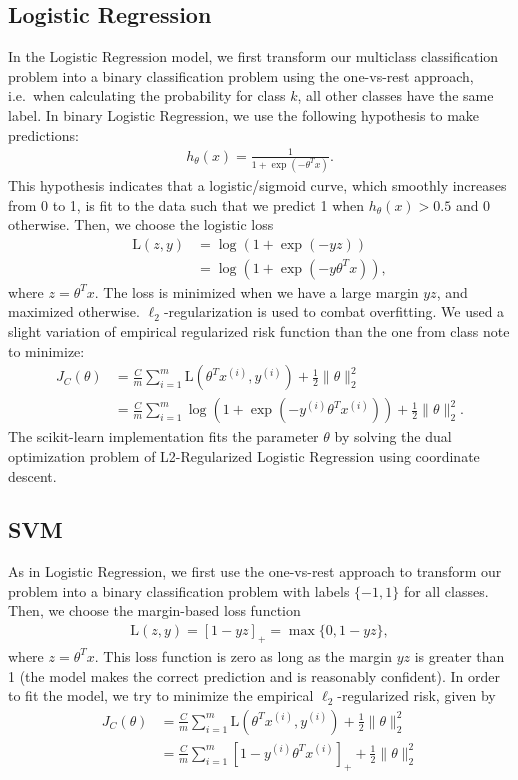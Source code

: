 \subsection{Logistic Regression}
In the Logistic Regression model, we first transform our multiclass classification problem into a binary classification problem using the one-vs-rest approach, i.e.\ when calculating the probability for class $k$, all other classes have the same label. In binary Logistic Regression, we use the following hypothesis to make predictions:
\begin{align*}
h_{\theta}(x) = \frac{1}{1+\exp(-\theta^Tx)}.
\end{align*}
This hypothesis indicates that a logistic/sigmoid curve, which smoothly increases from 0 to 1, is fit to the data such that we predict 1 when $h_\theta(x) > 0.5$ and 0 otherwise. Then, we choose the logistic loss
\begin{align*}
\mathrm{L}(z, y) &= \log(1+\exp(-yz))\\
&= \log(1+\exp(-y\theta^Tx)),
\end{align*}
where $z=\theta^Tx$. The loss is minimized when we have a large margin $yz$, and maximized otherwise. $\ell_2$-regularization is used to combat overfitting. We used a slight variation of empirical regularized risk function than the one from class note to minimize:
\begin{align}\label{eq:logreg}
J_C(\theta) &= \frac{C}{m}\sum_{i=1}^m\mathrm{L}(\theta^Tx^{(i)}, y^{(i)}) + \frac{1}{2}\lVert\theta\rVert_2^2\\
&= \frac{C}{m}\sum_{i=1}^m\log(1+\exp(-y^{(i)}\theta^Tx^{(i)})) + \frac{1}{2}\lVert\theta\rVert_2^2.
\end{align}
The scikit-learn implementation fits the parameter $\theta$ by solving the dual optimization problem of L2-Regularized Logistic Regression using coordinate descent\cite{fan2008liblinear}.

\subsection{SVM}
As in Logistic Regression, we first use the one-vs-rest approach to transform our problem into a binary classification problem with labels $\{-1, 1\}$ for all classes. Then, we choose the margin-based loss function
\begin{align*}
\mathrm{L}(z,y) = [1-yz]_+ = \max\{0, 1-yz\},
\end{align*}
where $z=\theta^Tx$. This loss function is zero as long as the margin $yz$ is greater than 1 (the model makes the correct prediction and is reasonably confident). In order to fit the model, we try to minimize the empirical $\ell_2$-regularized risk, given by
\begin{align}
J_C(\theta) &= \frac{C}{m}\sum_{i=1}^m\mathrm{L}(\theta^Tx^{(i)},y^{(i)}) + \frac{1}{2}\lVert\theta\rVert_2^2\\
&= \frac{C}{m}\sum_{i=1}^m[1-y^{(i)}\theta^Tx^{(i)}]_+ + \frac{1}{2}\lVert\theta\rVert_2^2
\end{align}

